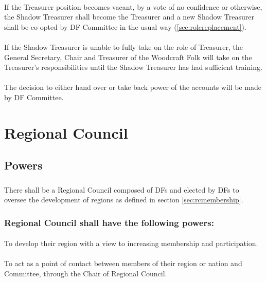 \documentclass[a4paper, 12pt]{report}
\begin{document}
\paragraph{} If the Treasurer position becomes vacant, by a vote of no confidence or otherwise, the Shadow Treasurer shall become the Treasurer and a new Shadow Treasurer shall be co-opted by DF Committee in the usual way (\ref{sec:rolereplacement}).
\paragraph{} If the Shadow Treasurer is unable to fully take on the role of Treasurer, the General Secretary, Chair and Treasurer of the Woodcraft Folk will take on the Treasurer's responsibilities until the Shadow Treasurer has had sufficient training.
\paragraph{} The decision to either hand over or take back power of the accounts will be made by DF Committee.

\section{Regional Council}
\subsection{Powers}
\subsubsection{}
There shall be a Regional Council composed of DFs and elected by DFs to oversee the development of regions as defined in section \ref{sec:rcmembership}.
\subsubsection{Regional Council shall have the following powers:}
\paragraph{}
To develop their region with a view to increasing membership and participation.
\paragraph{}
To act as a point of contact between members of their region or nation and Committee, through the Chair of Regional Council.
\end{document}
